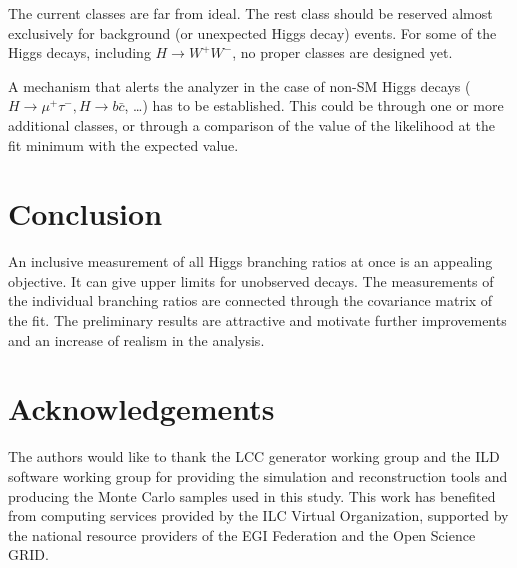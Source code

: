 \documentclass[11pt, hidelinks, a4paper]{scrartcl}
\begin{document}
The current classes are far from ideal.
The rest class should be reserved almost exclusively for
background (or unexpected Higgs decay) events.
For some of the Higgs decays, including $H \to W^+ W^-$,
no proper classes are designed yet.

A mechanism that alerts the analyzer in the case of non-SM Higgs decays
($H \to \mu^+\tau^-, H \to b\bar{c}$, \ldots)
has to be established.
This could be through one or more additional classes,
or through a comparison of the value of the likelihood at the fit minimum
with the expected value.

\section{Conclusion}\label{sec:conclusion}
An inclusive measurement of all Higgs branching ratios at once is
an appealing objective.
It can give upper limits for unobserved decays.
The measurements of the individual branching ratios are
connected through the covariance matrix of the fit.
The preliminary results are attractive and motivate
further improvements and an increase of realism in the analysis.

\section*{Acknowledgements}
The authors would like to thank the LCC generator working group and the ILD software working
group for providing the simulation and reconstruction tools and producing the Monte Carlo
samples used in this study. This work has benefited from computing services provided by
the ILC Virtual Organization, supported by the national resource providers of the EGI
Federation and the Open Science GRID.
\end{document}
